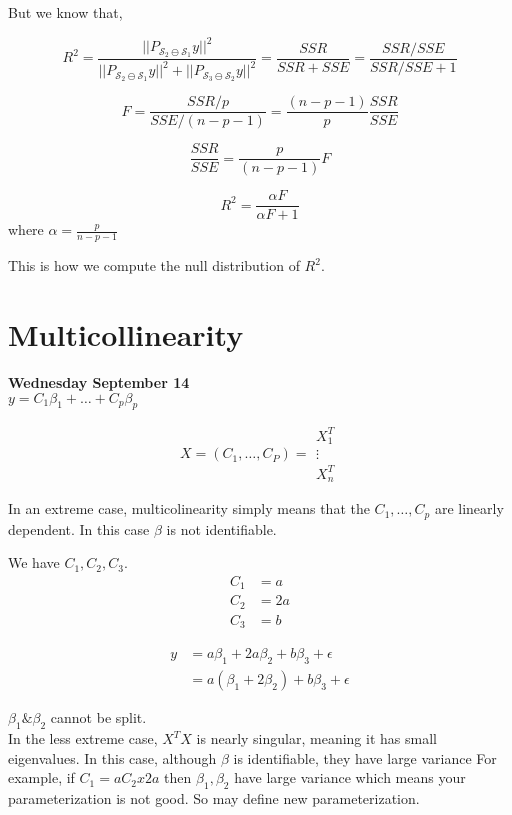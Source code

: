 \documentclass[11pt,fleqn]{book} %
\begin{document}
But we know that, 

$$R^2 = \frac{||P_{\mathscr{S}_2 \ominus \mathscr{S}_1}y||^2}{||P_{\mathscr{S}_2 \ominus \mathscr{S}_1}y||^2 + ||P_{\mathscr{S}_3 \ominus \mathscr{S}_2}y||^2} = \frac{SSR}{SSR + SSE} = \frac{SSR/SSE}{SSR/SSE + 1} $$

$$ F = \frac{SSR/p}{SSE/(n-p-1)} = \frac{(n-p-1)}{p} \frac{SSR}{SSE} $$

$$ \frac{SSR}{SSE} = \frac{p}{(n-p-1)} F$$

$$R^2 = \frac{\alpha F}{\alpha F + 1}$$
where $\alpha = \frac{p}{n-p-1}$

This is how we compute the null distribution of $R^2$. \\

\section{Multicollinearity}

\textbf{Wednesday September 14}\\

$y = C_1 \beta_1 + \dots + C_p \beta_p$

$$ X = (C_1, \dots, C_P) = \begin{matrix}
	X^T_1\\
	\vdots\\
	X^T_n
\end{matrix}$$

In an extreme case, multicolinearity simply means that the $C_1, \dots, C_p$ are linearly dependent. In this case $\beta$ is not identifiable. 

	We have $C_1, C_2, C_3$.\\

	\begin{align*}
		C_1 &= a\\
		C_2 &= 2a\\
		C_3 &= b
	\end{align*}

	\begin{align*}
		y &= a\beta_1 + 2a \beta_2 + b\beta_3 + \epsilon\\
		&= a(\beta_1 + 2\beta_2) + b\beta_3 + \epsilon
	\end{align*}
	
	$\beta_1 \& \beta_2$ cannot be split. \\

	In the less extreme case, $X^TX$ is nearly singular, meaning it has small eigenvalues. In this case, although $\beta$ is identifiable, they have large variance For example, if $C_1 = a C_2 x 2a$ then $\beta_1, \beta_2$ have large variance which means your parameterization is not good. So may define new parameterization.
\end{document}
